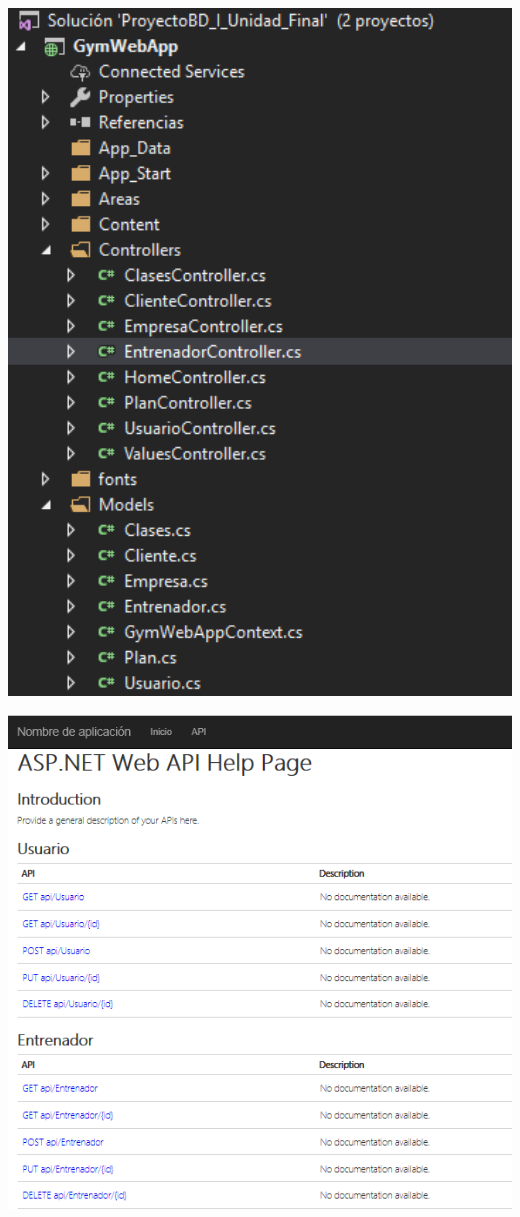              \begin{center}
			\includegraphics[width=15cm]{./Imagenes/1}
             \end{center}
        \begin{center}
			\includegraphics[width=15cm]{./Imagenes/2}
             \end{center}
